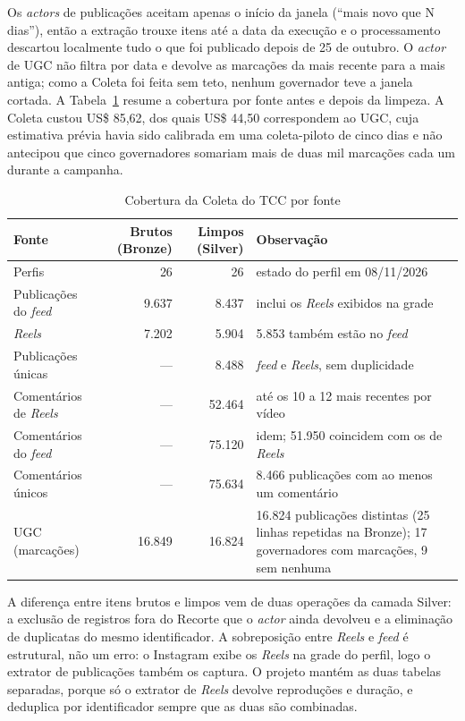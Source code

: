 Os \emph{actors} de publicações aceitam apenas o início da janela (``mais novo que N dias''), então a extração trouxe itens até a data da execução e o processamento descartou localmente tudo o que foi publicado depois de 25 de outubro. O \emph{actor} de UGC não filtra por data e devolve as marcações da mais recente para a mais antiga; como a Coleta foi feita sem teto, nenhum governador teve a janela cortada. A Tabela~\ref{tab:cobertura} resume a cobertura por fonte antes e depois da limpeza. A Coleta custou US\$ 85,62, dos quais US\$ 44,50 correspondem ao UGC, cuja estimativa prévia havia sido calibrada em uma coleta-piloto de cinco dias e não antecipou que cinco governadores somariam mais de duas mil marcações cada um durante a campanha.

\begin{table}[htb]
\centering
\caption{Cobertura da Coleta do TCC por fonte}
\label{tab:cobertura}
\footnotesize
\begin{tabular}{lrrp{5.1cm}}
\toprule
\textbf{Fonte} & \textbf{Brutos (Bronze)} & \textbf{Limpos (Silver)} & \textbf{Observação} \\
\midrule
Perfis & 26 & 26 & estado do perfil em 08/11/2026 \\
Publicações do \emph{feed} & 9.637 & 8.437 & inclui os \emph{Reels} exibidos na grade \\
\emph{Reels} & 7.202 & 5.904 & 5.853 também estão no \emph{feed} \\
Publicações únicas & --- & 8.488 & \emph{feed} e \emph{Reels}, sem duplicidade \\
Comentários de \emph{Reels} & --- & 52.464 & até os 10 a 12 mais recentes por vídeo \\
Comentários do \emph{feed} & --- & 75.120 & idem; 51.950 coincidem com os de \emph{Reels} \\
Comentários únicos & --- & 75.634 & 8.466 publicações com ao menos um comentário \\
UGC (marcações) & 16.849 & 16.824 & 16.824 publicações distintas (25 linhas repetidas na Bronze); 17 governadores com marcações, 9 sem nenhuma \\
\bottomrule
\end{tabular}
\end{table}

A diferença entre itens brutos e limpos vem de duas operações da camada Silver: a exclusão de registros fora do Recorte que o \emph{actor} ainda devolveu e a eliminação de duplicatas do mesmo identificador. A sobreposição entre \emph{Reels} e \emph{feed} é estrutural, não um erro: o Instagram exibe os \emph{Reels} na grade do perfil, logo o extrator de publicações também os captura. O projeto mantém as duas tabelas separadas, porque só o extrator de \emph{Reels} devolve reproduções e duração, e deduplica por identificador sempre que as duas são combinadas.


